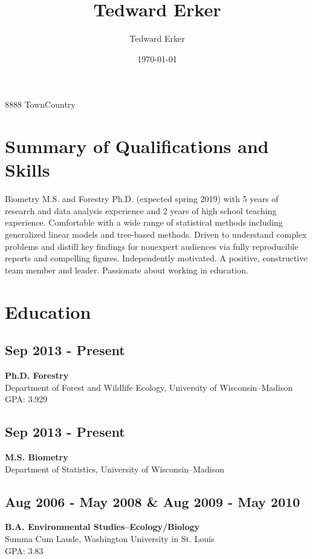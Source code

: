 \documentclass{article}
\author{Tedward Erker}
\date{\today}
\title{Tedward Erker}
\begin{document}
\maketitle
\address{Street St., 167}{8888 Town}{Country}

\section*{Summary of Qualifications and Skills}
\label{sec:org3cb65f6}
{\textwidth
Biometry M.S. and Forestry Ph.D. (expected spring 2019) with 5 years
of research and data analysis experience and 2 years of high school
teaching experience.  Comfortable with a wide range of statistical
methods including generalized linear models and tree-based
methods. Driven to understand complex problems and distill key
findings for nonexpert audiences via fully reproducible reports and
compelling figures.  Independently motivated. A positive, constructive
team member and leader.  Passionate about working in education.
\par}
\section*{Education}
\label{sec:org6d632de}
\subsection*{Sep 2013 - Present}
\label{sec:org3aea060}
\textbf{Ph.D. Forestry} \\
Department of Forest and Wildlife Ecology, University of Wisconsin--Madison \\
GPA: 3.929

\subsection*{Sep 2013 - Present}
\label{sec:orgabf220f}
\textbf{M.S. Biometry} \\
Department of Statistics, University of Wisconsin--Madison

\subsection*{Aug 2006 - May 2008 \& Aug 2009 - May 2010}
\label{sec:org30f0085}
\textbf{B.A. Environmental Studies--Ecology/Biology} \\
Summa Cum Laude, Washington University in St. Louis \\
GPA: 3.83
\end{document}
